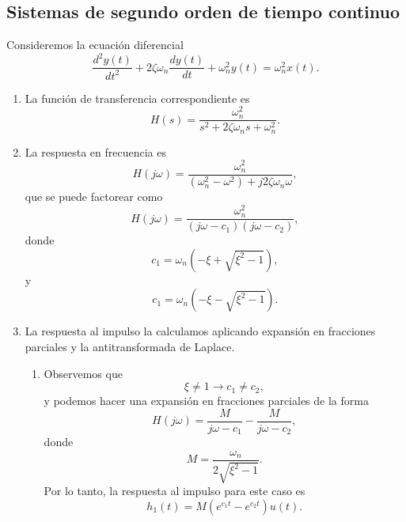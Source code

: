 \subsection{Sistemas de segundo orden de tiempo continuo}

Consideremos la ecuaci\'{o}n diferencial 
\begin{equation}
   \frac{d^{2}y\left( t\right) }{dt^{2}}+
   2\zeta \omega_{n}\frac{dy\left(t\right) }{dt}+
   \omega_{n}^{2}y\left( t\right) =\omega _{n}^{2}x\left(t\right) .
\end{equation}

\begin{enumerate}
\item  La funci\'{o}n de transferencia correspondiente es 
\begin{equation}
  H\left( s\right) =\frac{\omega _{n}^{2}}{s^{2}+2\zeta \omega _{n}s+\omega_{n}^{2}}.
\end{equation}

\item  La respuesta en frecuencia es 
\begin{equation}
   H\left( j\omega \right) =
   \frac{\omega _{n}^{2}}{\left( \omega_{n}^{2}-\omega^{2}\right) +j2\zeta \omega_{n}\omega },
\end{equation}
que se puede factorear como 
\begin{equation}
  H\left( j\omega \right) =
  \frac{\omega _{n}^{2}}{\left( j\omega-c_{1}\right) \left( j\omega -c_{2}\right) },
\end{equation}
donde 
\begin{equation}
c_{1}=\omega _{n}\left( -\xi +\sqrt{\xi ^{2}-1}\right) ,
\end{equation}
y 
\begin{equation}
c_{1}=\omega _{n}\left( -\xi -\sqrt{\xi ^{2}-1}\right) .
\end{equation}

\item La respuesta al impulso la calculamos aplicando expansi\'{o}n en fracciones parciales y la 
antitransformada de Laplace.
\begin{enumerate}
\item  Observemos que 
\begin{equation}
\xi \neq 1\rightarrow c_{1}\neq c_{2},
\end{equation}
y podemos hacer una expansi\'{o}n en fracciones parciales de la forma 
\begin{equation}
H\left( j\omega \right) =\frac{M}{j\omega -c_{1}}-\frac{M}{j\omega -c_{2}},
\end{equation}
donde 
\begin{equation}
M=\frac{\omega _{n}}{2\sqrt{\xi ^{2}-1}}.
\end{equation}
Por lo tanto, la respuesta al impulso para este caso es 
\begin{equation}
h_{1}\left( t\right) =M\left( e^{c_{1}t}-e^{c_{2}t}\right) u\left( t\right) .
\end{equation}


\end{enumerate}
\end{enumerate}
